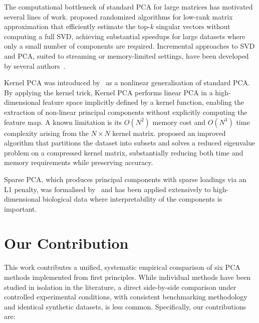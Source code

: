 The computational bottleneck of standard PCA for large matrices has motivated several lines of work. \citet{halko2011finding} proposed randomized algorithms for low-rank matrix approximation that efficiently estimate the top-$k$ singular vectors without computing a full SVD, achieving substantial speedups for large datasets where only a small number of components are required. Incremental approaches to SVD and PCA, suited to streaming or memory-limited settings, have been developed by several authors~\citep{ross2008incremental, cardot2018online}.
\smallskip 

Kernel PCA was introduced by~\citet{scholkopf1997kernel} as a nonlinear generalisation of standard PCA. By applying the kernel trick, Kernel PCA performs linear PCA in a high-dimensional feature space implicitly defined by a kernel function, enabling the extraction of non-linear principal components without explicitly computing the feature map. A known limitation is its $O(N^2)$ memory cost and $O(N^3)$ time complexity arising from the $N \times N$ kernel matrix. \citet{zheng2005improved} proposed an improved algorithm that partitions the dataset into subsets and solves a reduced eigenvalue
problem on a compressed kernel matrix, substantially reducing both time and memory requirements while preserving accuracy.
\smallskip 

Sparse PCA, which produces principal components with sparse loadings via an L1 penalty, was formalised by~\citet{zou2006sparse} and has been applied
extensively to high-dimensional biological data where interpretability of the components is important.

\section{Our Contribution}

This work contributes a unified, systematic empirical comparison of six PCA methods implemented from first principles. While individual methods have been studied in isolation in the literature, a direct side-by-side comparison under controlled experimental conditions, with consistent benchmarking methodology and identical synthetic datasets, is less common. Specifically, our contributions are:

